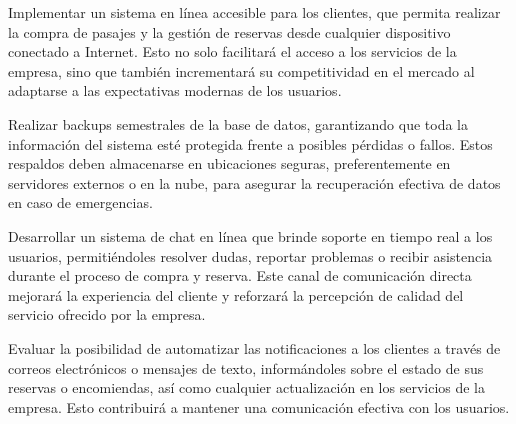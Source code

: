 	Implementar un sistema en línea accesible para los clientes, que permita realizar la compra de pasajes y la gestión de reservas desde cualquier dispositivo conectado a Internet. Esto no solo facilitará el acceso a los servicios de la empresa, sino que también incrementará su competitividad en el mercado al adaptarse a las expectativas modernas de los usuarios.
	
	Realizar backups semestrales de la base de datos, garantizando que toda la información del sistema esté protegida frente a posibles pérdidas o fallos. Estos respaldos deben almacenarse en ubicaciones seguras, preferentemente en servidores externos o en la nube, para asegurar la recuperación efectiva de datos en caso de emergencias.
	
	Desarrollar un sistema de chat en línea que brinde soporte en tiempo real a los usuarios, permitiéndoles resolver dudas, reportar problemas o recibir asistencia durante el proceso de compra y reserva. Este canal de comunicación directa mejorará la experiencia del cliente y reforzará la percepción de calidad del servicio ofrecido por la empresa.
	
	Evaluar la posibilidad de automatizar las notificaciones a los clientes a través de correos electrónicos o mensajes de texto, informándoles sobre el estado de sus reservas o encomiendas, así como cualquier actualización en los servicios de la empresa. Esto contribuirá a mantener una comunicación efectiva con los usuarios.
	